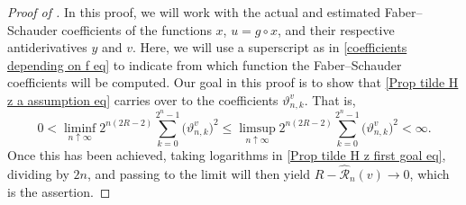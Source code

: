 \documentclass[10pt,a4paper]{amsart}
\def\cR{{\mathscr R}}
\def\ua{\uparrow}
\def\wh{\widehat}
\begin{document}
\begin{proof}[Proof of ]
	In this proof, we will work with the actual and estimated Faber--Schauder coefficients of the functions $x$,  $u=g\circ x$, and their respective antiderivatives $y$ and $v$. Here, we will use a superscript as in \eqref{coefficients depending on f eq} to indicate from which function the Faber--Schauder coefficients will be computed. Our goal in this proof is to show that \eqref{Prop tilde H z a assumption eq} carries over to the coefficients $\vartheta^v_{n,k}$.
	That is, 
	\begin{equation}\label{Prop tilde H z first goal eq}
		0<\liminf_{n \ua \infty}2^{n(2{R}-2)}\sum_{k = 0}^{2^{n}-1}\big(\vartheta^v_{n,k}\big)^2\le \limsup_{n \ua \infty}2^{n(2{R}-2)}\sum_{k = 0}^{2^{n}-1}\big(\vartheta^v_{n,k}\big)^2<\infty.	\end{equation}
Once this has been achieved, taking logarithms in \eqref{Prop tilde H z first goal eq}, dividing by $2n$, and passing to the limit will then yield
	${R}-\wh\cR_n(v)\to0$, which is the assertion. 
	

\end{proof}
\end{document}
